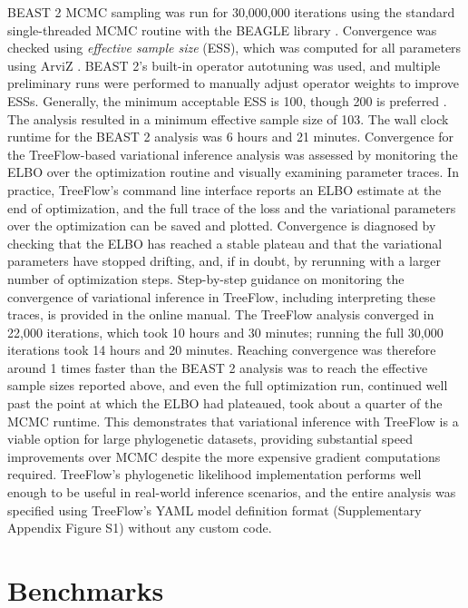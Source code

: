 \documentclass[oupdraft]{sysbio_sse}
\let\cite\citep
\begin{document}
BEAST 2 MCMC sampling was run for 30,000,000 iterations using the standard single-threaded MCMC routine with the BEAGLE library \cite{ayres2019beagle}. Convergence was checked using \textit{effective sample size} (ESS), which was computed for all parameters using ArviZ \cite{kumar2019arviz}. BEAST 2's built-in operator autotuning was used, and multiple preliminary runs were performed to manually adjust operator weights to improve ESSs. Generally, the minimum acceptable ESS is 100, though 200 is preferred \cite{drummond2015bayesian}. The analysis resulted in a minimum effective sample size of 103. The wall clock runtime for the BEAST 2 analysis was 6 hours and 21 minutes. Convergence for the TreeFlow-based variational inference analysis was assessed by monitoring the ELBO over the optimization routine and visually examining parameter traces. In practice, TreeFlow's command line interface reports an ELBO estimate at the end of optimization, and the full trace of the loss and the variational parameters over the optimization can be saved and plotted. Convergence is diagnosed by checking that the ELBO has reached a stable plateau and that the variational parameters have stopped drifting, and, if in doubt, by rerunning with a larger number of optimization steps. Step-by-step guidance on monitoring the convergence of variational inference in TreeFlow, including interpreting these traces, is provided in the online manual. The TreeFlow analysis converged in 22,000 iterations, which took 10 hours and 30 minutes; running the full 30,000 iterations took 14 hours and 20 minutes. Reaching convergence was therefore around 1 times faster than the BEAST 2 analysis was to reach the effective sample sizes reported above, and even the full optimization run, continued well past the point at which the ELBO had plateaued, took about a quarter of the MCMC runtime. This demonstrates that variational inference with TreeFlow is a viable option for large phylogenetic datasets, providing substantial speed improvements over MCMC despite the more expensive gradient computations required. TreeFlow's phylogenetic likelihood implementation performs well enough to be useful in real-world inference scenarios, and the entire analysis was specified using TreeFlow's YAML model definition format (Supplementary Appendix Figure S1) without any custom code.

\section{Benchmarks}
\label{benchmarks}
\end{document}
